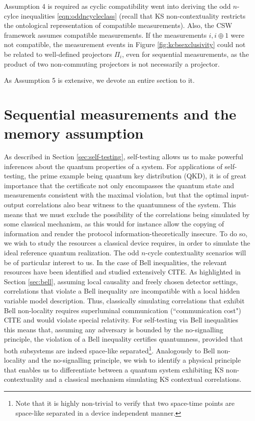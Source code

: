 Assumption 4 is required as cyclic compatibility went into deriving the odd $n$-cylce inequalities \ref{eqn:oddncycleclass} (recall that KS non-contextuality restricts the ontological representation of compatible measurements). Also, the CSW framework assumes compatible measurements. If the measurements $i,i\oplus 1$ were not compatible, the measurement events in Figure \ref{fig:kcbsexclusivity} could not be related to well-defined projectors $\Pi_i$, even for sequential measurements, as the product of two non-commuting projectors is not necessarily a projector.

As Assumption 5 is extensive, we devote an entire section to it. 

\section{Sequential measurements and the memory assumption}
\label{sec:memoryass}
As described in Section \ref{sec:self-testing}, self-testing allows us to make powerful inferences about the quantum properties of a system. For applications of self-testing, the prime example being quantum key distribution (QKD), it is of great importance that the certificate not only encompasses the quantum state and measurements consistent with the maximal violation, but that the optimal input-output correlations also bear witness to the quantumness of the system. This means that we must exclude the possibility of the correlations being simulated by some classical mechanism, as this would for instance allow the copying of information and render the protocol information-theoretically insecure. To do so, we wish to study the resources a classical device requires, in order to simulate the ideal reference quantum realization. The odd $n$-cycle contextuality scenarios will be of particular interest to us. 
In the case of Bell inequalities, the relevant resources have been identified and studied extensively CITE. As highlighted in Section \ref{sec:bell}, assuming local causality and freely chosen detector settings, correlations that violate a Bell inequality are incompatible with a local hidden variable model description. Thus, classically simulating correlations that exhibit Bell non-locality requires superluminal communication (``communication cost") CITE and would violate special relativity. For self-testing via Bell inequalities this means that, assuming any adversary is bounded by the no-signalling principle, the violation of a Bell inequality certifies quantumness, provided that both subsystems are indeed space-like separated\footnote{Note that it is highly non-trivial to verify that two space-time points are space-like separated in a device independent manner.}. Analogously to Bell non-locality and the no-signalling principle, we wish to identify a physical principle that enables us to differentiate between a quantum system exhibiting KS non-contextuality and a classical mechanism simulating KS contextual correlations.
